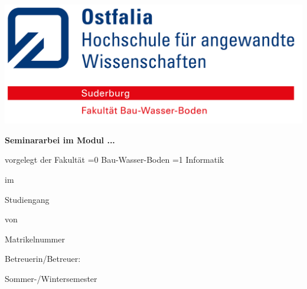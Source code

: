 
\begin{titlepage}
	
	\hfill
	\includegraphics[scale=1]{Bilder/OF_Logo_de_B.jpg}
	
	\begin{center}
	 	\vfil
	 	
		{\Huge\textbf{\textsf{\documenttitle}}}
		
		\vspace{2em}
		
		{\LARGE\textbf{\textsf{Seminararbei im Modul ...\documentmodul}}}
		
		\vspace{4em}
		
		{\Large\textsf{vorgelegt der Fakultät 
   			\ifnum\value{documentfakultaet}=0
				Bau-Wasser-Boden
			\fi\ifnum\value{documentfakultaet}=1
				Informatik
			\fi
		}}
		
		{\Large\textsf{im}}
		
		{\Large\textsf{Studiengang \documentstudiengang}}
		
		{\Large\textsf{von}}
	
		{\Large\textsf{\documentname}}

		{\Large\textsf{Matrikelnummer \documentmanr}}

		\vfil

		{\Large\textsf{Betreuerin/Betreuer: \documentbetreuer}}
		
		\vfil
		
		{\Large\textsf{Sommer-/Wintersemester \documentsemester}}
		
		\enlargethispage{10\baselineskip}
	\end{center}	
\end{titlepage}

\restoregeometry
